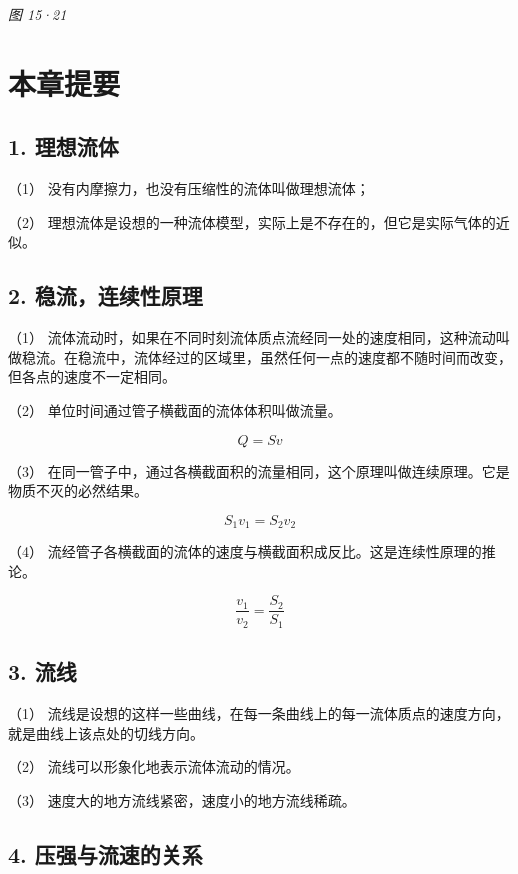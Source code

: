 \emph{图 15·21}

\section{本章提要}\label{ux672cux7ae0ux63d0ux8981-14}

\subsection{1. 理想流体}\label{ux7406ux60f3ux6d41ux4f53-1}

（1） 没有内摩擦力，也没有压缩性的流体叫做理想流体；

（2）
理想流体是设想的一种流体模型，实际上是不存在的，但它是实际气体的近似。

\subsection{2.
稳流，连续性原理}\label{ux7a33ux6d41ux8fdeux7eedux6027ux539fux7406}

（1）
流体流动时，如果在不同时刻流体质点流经同一处的速度相同，这种流动叫做稳流。在稳流中，流体经过的区域里，虽然任何一点的速度都不随时间而改变，但各点的速度不一定相同。

（2） 单位时间通过管子横截面的流体体积叫做流量。

\[
Q = S v
\]

（3）
在同一管子中，通过各横截面积的流量相同，这个原理叫做连续原理。它是物质不灭的必然结果。

\[
S _ {1} v _ {1} = S _ {2} v _ {2}
\]

（4）
流经管子各横截面的流体的速度与横截面积成反比。这是连续性原理的推论。

\[
\frac {v _ {1}}{v _ {2}} = \frac {S _ {2}}{S _ {1}}
\]

\subsection{3. 流线}\label{ux6d41ux7ebf-1}

（1）
流线是设想的这样一些曲线，在每一条曲线上的每一流体质点的速度方向，就是曲线上该点处的切线方向。

（2） 流线可以形象化地表示流体流动的情况。

（3） 速度大的地方流线紧密，速度小的地方流线稀疏。

\subsection{4.
压强与流速的关系}\label{ux538bux5f3aux4e0eux6d41ux901fux7684ux5173ux7cfb}

